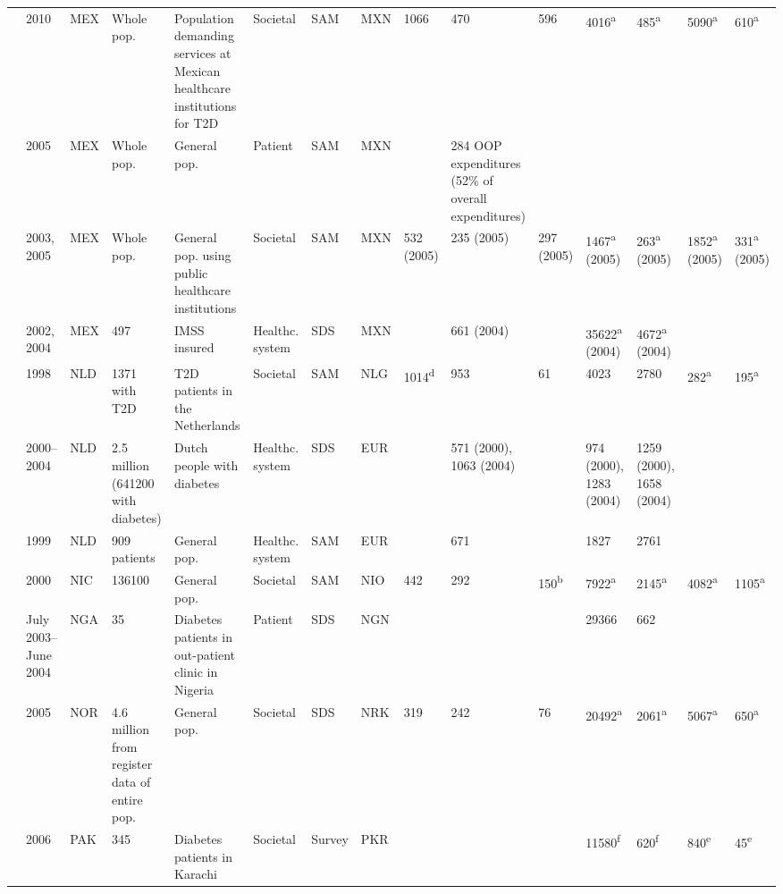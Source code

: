 {\begin{landscape}
\begin{tabularx}{\linewidth}{Z X X Z Z X X X X X X X X Y Y}
\textcite{Arredondo2011b} & 2010 & MEX & Whole pop. & Population demanding services at Mexican   healthcare institutions for T2D & Societal & SAM & MXN & 1066 & 470 & 596 & 4016\textsuperscript{a} & 485\textsuperscript{a} & 5090\textsuperscript{a} & 610\textsuperscript{a} \\
\textcite{Arredondo2007} & 2005 & MEX & Whole pop. & General pop. & Patient & SAM & MXN &  & 284   \ac{OOP} expenditures (52\% of overall expenditures) &  &  &  &  &  \\
\textcite{Arredondo2004} & 2003, 2005 & MEX & Whole pop. & General pop. using public healthcare   institutions & Societal & SAM & MXN & 532 (2005) & 235 (2005) & 297 (2005) & 1467\textsuperscript{a}    (2005) & 263\textsuperscript{a}    (2005) & 1852\textsuperscript{a}    (2005) & 331\textsuperscript{a}    (2005) \\
\textcite{RodriguezBolanos2010a} & 2002, 2004 & MEX & 497 & IMSS insured & Healthc. system & SDS & MXN &  & 661 (2004) &  & 35622\textsuperscript{a}    (2004) & 4672\textsuperscript{a}    (2004) &  &  \\
\textcite{Redekop2002b} & 1998 & NLD & 1371 with T2D & T2D patients in the Netherlands & Societal & SAM & NLG & 1014\textsuperscript{d} & 953 & 61 & 4023 & 2780 & 282\textsuperscript{a} & 195\textsuperscript{a} \\
\textcite{VanderLinden2009c} & 2000--2004 & NLD & 2.5 million (641200 with diabetes) & Dutch people with diabetes & Healthc. system & SDS & EUR &  & 571 (2000), 1063 (2004) &  & 974 (2000), 1283 (2004) & 1259 (2000), 1658 (2004) &  &  \\
\textcite{Jonsson2002b} & 1999 & NLD & 909 patients & General pop. & Healthc. system & SAM & EUR &  & 671 &  & 1827 & 2761 &  &  \\
\textcite{Barcelo2003} & 2000 & NIC & 136100 & General pop. & Societal & SAM & NIO & 442 & 292 & 150\textsuperscript{b} & 7922\textsuperscript{a} & 2145\textsuperscript{a} & 4082\textsuperscript{a} & 1105\textsuperscript{a} \\
\textcite{Suleiman2006} & July 2003--June 2004 & NGA & 35 & Diabetes patients in out-patient clinic in   Nigeria & Patient & SDS & NGN &  &  &  & 29366 & 662 &  &  \\
\textcite{Solli2010a} & 2005 & NOR & 4.6 million from register data of entire   pop. & General pop. & Societal & SDS & NRK & 319 & 242 & 76 & 20492\textsuperscript{a} & 2061\textsuperscript{a} & 5067\textsuperscript{a} & 650\textsuperscript{a} \\
\textcite{Khowaja2007a} & 2006 & PAK & 345 & Diabetes patients in Karachi & Societal & Survey & PKR &  &  &  & 11580\textsuperscript{f} & 620\textsuperscript{f} & 840\textsuperscript{e} & 45\textsuperscript{e} \\

\end{tabularx}
\end{landscape}}
